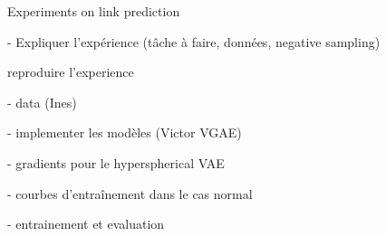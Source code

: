 \begin{frame}{Experiments on link prediction}

    - Expliquer l'expérience (tâche à faire, données, negative sampling)
    
    reproduire l'experience 
  
    - data (Ines)
  
    - implementer les modèles (Victor VGAE)
    
    - gradients pour le hyperspherical VAE
    
    - courbes d'entraînement dans le cas normal
  
    - entrainement et evaluation 
  
  \end{frame}